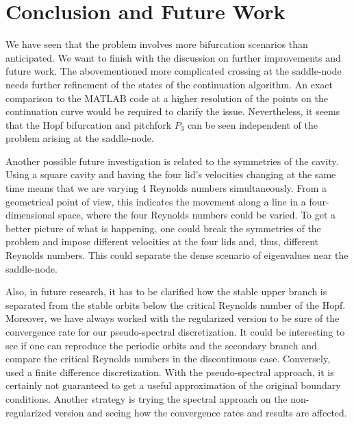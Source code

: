 
\section{Conclusion and Future Work} \label{concl}

We have seen that the problem involves more bifurcation scenarios than
anticipated. We want to finish with the discussion on further improvements and
future work. The abovementioned more complicated crossing at the saddle-node
needs further refinement of the states of the continuation algorithm. An exact
comparison to the MATLAB code at a higher resolution of the points on the
continuation curve would be required to clarify the issue. Nevertheless, it
seems that the Hopf bifurcation and pitchfork $P_3$ can be seen independent of
the problem arising at the saddle-node. 

Another possible future investigation is related to the symmetries of the
cavity. Using a square cavity and having the four lid's velocities changing at
the same time means that we are varying 4 Reynolds numbers simultaneously. From
a geometrical point of view, this indicates the movement along a line in a
four-dimensional space, where the four Reynolds numbers could be varied. To get
a better picture of what is happening, one could break the symmetries of the
problem and impose different velocities at the four lids and, thus, different
Reynolds numbers. This could separate the dense scenario of eigenvalues near
the saddle-node.

Also, in future research, it has to be clarified how the stable upper branch is
separated from the stable orbits below the critical Reynolds number of the
Hopf. Moreover, we have always worked with the regularized version to be sure
of the convergence rate for our pseudo-spectral discretization. It could be
interesting to see if one can reproduce the periodic orbits and the secondary
branch and compare the critical Reynolds numbers in the discontinuous case.
Conversely, \citet{chen2013} used a finite difference discretization. With the
pseudo-spectral approach, it is certainly not guaranteed to get a useful
approximation of the original boundary conditions. Another strategy is trying
the spectral approach on the non-regularized version and seeing how the
convergence rates and results are affected.

